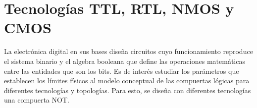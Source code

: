 \section{Tecnolog\'ias TTL, RTL, NMOS y CMOS}
La electr\'onica digital en sus bases dise\~na circuitos cuyo funcionamiento reproduce el sistema binario
y el algebra booleana que define las operaciones matem\'aticas entre las entidades que son los bits. Es de inter\'es estudiar los par\'ametros
que establecen los l\'imites f\'isicos al modelo conceptual de las compuertas l\'ogicas para diferentes tecnolog\'ias y topolog\'ias. Para esto, 
se dise\~na con diferentes tecnolog\'ias una compuerta NOT.